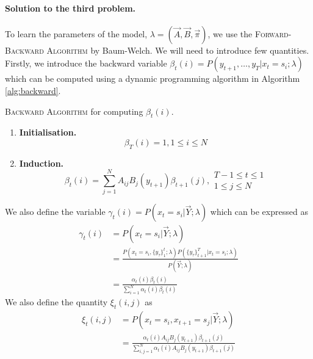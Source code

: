 	\paragraph{Solution to the third problem.}
	To learn the parameters of the model, $\lambda = \left( \vec A, \vec B, \vec \pi \right)$, we use the \textsc{Forward-Backward Algorithm} by Baum-Welch. We will need to introduce few quantities. Firstly, we introduce the backward variable $\beta_t(i) = P\left( y_{t + 1}, \dotsc, y_T | x_t = s_i; \lambda \right)$ which can be computed using a dynamic programming algorithm in Algorithm \ref{alg:backward}.
	\begin{algorithm}
		\caption{\textsc{Backward Algorithm} for computing $\beta_t(i)$.}
		\label{alg:backward}
		\begin{enumerate}
			\item
				\textbf{Initialisation.}
				$$\beta_T(i) = 1, 1 \leq i \leq N$$
			\item
				\textbf{Induction.}
				\begin{equation*}
					\beta_t(i) = \sum_{j = 1}^N A_{ij} B_j(y_{t + 1}) \beta_{t + 1}(j), 
					\begin{array}{lr}
						T - 1 \leq t \leq 1\\
						1 \leq j \leq N
					\end{array}
				\end{equation*}
		\end{enumerate}
	\end{algorithm}
	We also define the variable $\gamma_t(i) = P\left( x_t = s_i | \vec Y; \lambda \right)$ which can be expressed as
	\begin{align}
		\gamma_t(i) 	& = P\left( x_t = s_i | \vec Y; \lambda \right) \nonumber\\
				& = \frac{ P\left( x_t = s_i, \{ y_\tau \}_1^t; \lambda \right)  P\left( \{ y_\tau \}_{t + 1}^T | x_t = s_i; \lambda \right)}{ P\left( \vec Y; \lambda \right)} \nonumber\\
				& = \frac{\alpha_t(i) \beta_t(i)}{\sum_{i = 1}^N \alpha_t(i) \beta_t(i)} \label{eqn:hmmGamma}
	\end{align}
	We also define the quantity $\xi_t(i, j)$ as
	\begin{align}
		\xi_t(i, j) 	& = P\left(x_t = s_i, x_{t + 1} = s_j | \vec Y; \lambda \right) \nonumber\\
				& = \frac{\alpha_t(i) A_{ij} B_j(y_{t + 1}) \beta_{t + 1}(j)}{\sum_{i, j = 1}^N \alpha_t(i) A_{ij} B_j(y_{t + 1}) \beta_{t + 1}(j)}
	\end{align}
